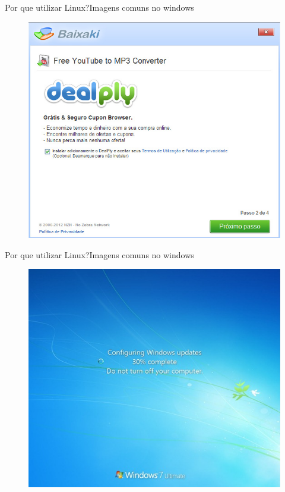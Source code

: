 \documentclass{beamer}
\begin{document}
\begin{frame}{Por que utilizar Linux?}{Imagens comuns no windows}
    \begin{figure}[h!]
        \centering
        \includegraphics[scale=0.3]{dealply.jpg}
    \end{figure}
\end{frame}

\begin{frame}{Por que utilizar Linux?}{Imagens comuns no windows}
    \begin{figure}[h!]
        \centering
        \includegraphics[scale=0.4]{update.png}
    \end{figure}
\end{frame}
\end{document}

